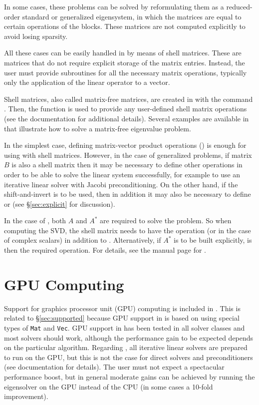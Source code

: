 	In some cases, these problems can be solved by reformulating them as a reduced-order standard or generalized eigensystem, in which the matrices are equal to certain operations of the blocks. These matrices are not computed explicitly to avoid losing sparsity.

	All these cases can be easily handled in \slepc by means of shell matrices. These are matrices that do not require explicit storage of the matrix entries. Instead, the user must provide subroutines for all the necessary matrix operations, typically only the application of the linear operator to a vector.

	Shell matrices, also called matrix-free matrices, are created in \petsc with the command . Then, the function  is used to provide any user-defined shell matrix operations (see the \petsc{} documentation for additional details). Several examples are available in \slepc that illustrate how to solve a matrix-free eigenvalue problem.

	In the simplest case, defining matrix-vector product operations () is enough for using  with shell matrices. However, in the case of generalized problems, if matrix $B$ is also a shell matrix then it may be necessary to define other operations in order to be able to solve the linear system successfully, for example  to use an iterative linear solver with Jacobi preconditioning. On the other hand, if the shift-and-invert  is to be used, then in addition it may also be necessary to define  or  (see \S\ref{sec:explicit} for discussion).

	In the case of , both $A$ and $A^*$ are required to solve the problem. So when computing the SVD, the shell matrix needs to have the  operation (or  in the case of complex scalars) in addition to . Alternatively, if $A^*$ is to be built explicitly,  is then the required operation. For details, see the manual page for .

\section{GPU Computing}
\label{sec:gpu}

Support for graphics processor unit (GPU) computing is included in \slepc. This is related to \S\ref{sec:supported} because GPU support in \petsc is based on using special types of \texttt{Mat} and \texttt{Vec}. GPU support in \slepc has been tested in all solver classes and most solvers should work, although the performance gain to be expected depends on the particular algorithm. Regarding \petsc, all iterative linear solvers are prepared to run on the GPU, but this is not the case for direct solvers and preconditioners (see \petsc documentation for details). The user must not expect a spectacular performance boost, but in general moderate gains can be achieved by running the eigensolver on the GPU instead of the CPU (in some cases a 10-fold improvement).

